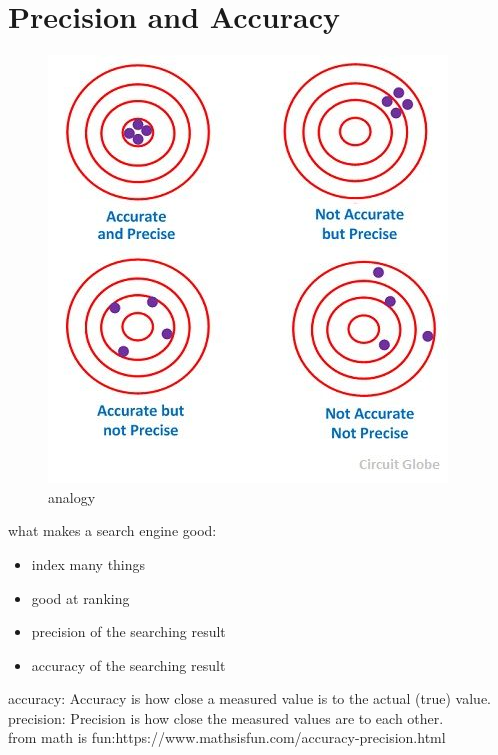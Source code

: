 \documentclass[fancy,11pt,titlestyle=display]{style/elegantbook}
\begin{document}
\section{Precision and Accuracy}
\begin{figure}[htp]
    \centering
    \includegraphics[width=\textwidth]{image/myfolder/searchanalogy.png}
    \caption{analogy}
     
\end{figure}
\vfill
\clearpage



what makes a search engine good:

\begin{itemize}
    \item index many things
    \item good at ranking
    \item precision of the searching result
    \item accuracy of the searching result
\end{itemize}{} 

accuracy: Accuracy is how close a measured value is to the actual (true) value.\\
precision: Precision is how close the measured values are to each other.\\
from math is fun:https://www.mathsisfun.com/accuracy-precision.html\\
\end{document}
